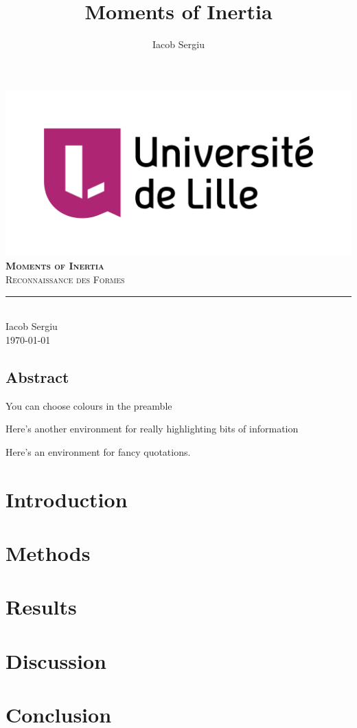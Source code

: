 \documentclass[11pt,titlepage]{report}
\author{Iacob Sergiu}
\title{Moments of Inertia}
\begin{document}
\begin{titlepage}
	\centering
    \includegraphics[width=0.75\linewidth]{Images/universite_de_lille.png}\\[0.25cm] 	%
    \vspace{\fill}
    \textbf{\textsc{\fontsize{50}{50}\selectfont Moments of Inertia}}\\ \vspace{\fill}		
	\textsc{\LARGE Reconnaissance des Formes}\\[0.4cm]
	\rule{\linewidth}{0.2 mm} \\[0.5 cm]
	Iacob Sergiu \\[2cm]
	\today
\end{titlepage}
\restoregeometry

\thispagestyle{numberonly}
\begin{summary}
\section*{Abstract}

You can choose colours in the preamble

\lipsum[1]
\end{summary}

\begin{invsummary}
Here's another environment for really highlighting bits of information

\lipsum[2]
\end{invsummary}

\begin{fquote}Here's an environment for fancy quotations. \lipsum[3]
\end{fquote}


\chapter{Introduction}


\chapter{Methods}


\chapter{Results}


\chapter{Discussion}


\chapter{Conclusion}


\clearpage
\pagestyle{numberonly}
\printbibliography
\end{document}

